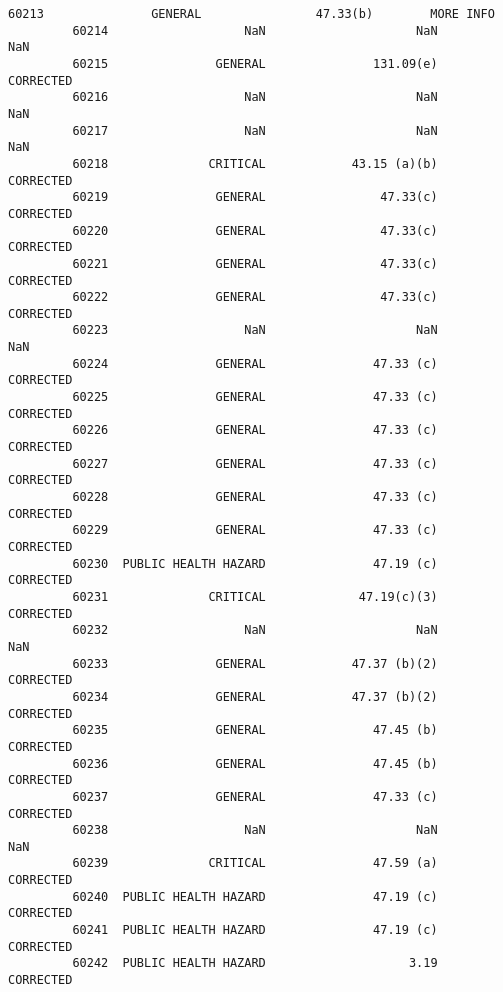 \documentclass[11pt]{article}
\begin{document}
\begin{Verbatim}[commandchars=\\\{\}]
         60213               GENERAL                47.33(b)        MORE INFO   
         60214                   NaN                     NaN              NaN   
         60215               GENERAL               131.09(e)        CORRECTED   
         60216                   NaN                     NaN              NaN   
         60217                   NaN                     NaN              NaN   
         60218              CRITICAL            43.15 (a)(b)        CORRECTED   
         60219               GENERAL                47.33(c)        CORRECTED   
         60220               GENERAL                47.33(c)        CORRECTED   
         60221               GENERAL                47.33(c)        CORRECTED   
         60222               GENERAL                47.33(c)        CORRECTED   
         60223                   NaN                     NaN              NaN   
         60224               GENERAL               47.33 (c)        CORRECTED   
         60225               GENERAL               47.33 (c)        CORRECTED   
         60226               GENERAL               47.33 (c)        CORRECTED   
         60227               GENERAL               47.33 (c)        CORRECTED   
         60228               GENERAL               47.33 (c)        CORRECTED   
         60229               GENERAL               47.33 (c)        CORRECTED   
         60230  PUBLIC HEALTH HAZARD               47.19 (c)        CORRECTED   
         60231              CRITICAL             47.19(c)(3)        CORRECTED   
         60232                   NaN                     NaN              NaN   
         60233               GENERAL            47.37 (b)(2)        CORRECTED   
         60234               GENERAL            47.37 (b)(2)        CORRECTED   
         60235               GENERAL               47.45 (b)        CORRECTED   
         60236               GENERAL               47.45 (b)        CORRECTED   
         60237               GENERAL               47.33 (c)        CORRECTED   
         60238                   NaN                     NaN              NaN   
         60239              CRITICAL               47.59 (a)        CORRECTED   
         60240  PUBLIC HEALTH HAZARD               47.19 (c)        CORRECTED   
         60241  PUBLIC HEALTH HAZARD               47.19 (c)        CORRECTED   
         60242  PUBLIC HEALTH HAZARD                    3.19        CORRECTED   
         

\end{Verbatim}
\end{document}
